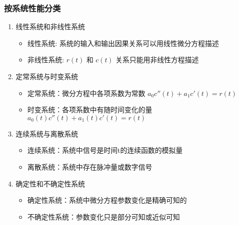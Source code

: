 \documentclass{beamer}
\begin{document}
\begin{frame}
\frametitle{按系统性能分类}
\label{sec-1-6}

\begin{enumerate}
\item <2->线性系统和非线性系统
\begin{itemize}
\item 线性系统: 系统的输入和输出因果关系可以用线性微分方程描述
\item 非线性系统: $r(t)$ 和 $c(t)$ 关系只能用非线性方程描述
\end{itemize}
\item <3->定常系统与时变系统
\begin{itemize}
\item 定常系统：微分方程中各项系数为常数 $a_0c''(t)+a_1c'(t)=r(t)$
\item 时变系统：各项系数中有随时间变化的量 $a_0(t)c''(t)+a_1(t)c'(t)=r(t)$
\end{itemize}
\item <4->连续系统与离散系统
\begin{itemize}
\item 连续系统：系统中信号是时间t的连续函数的模拟量
\item 离散系统：系统中存在脉冲量或数字信号
\end{itemize}
\item <5->确定性和不确定性系统
\begin{itemize}
\item 确定性系统：系统中微分方程参数变化是精确可知的
\item 不确定性系统：参数变化只是部分可知或近似可知
\end{itemize}
\end{enumerate}
\end{frame}
\end{document}
